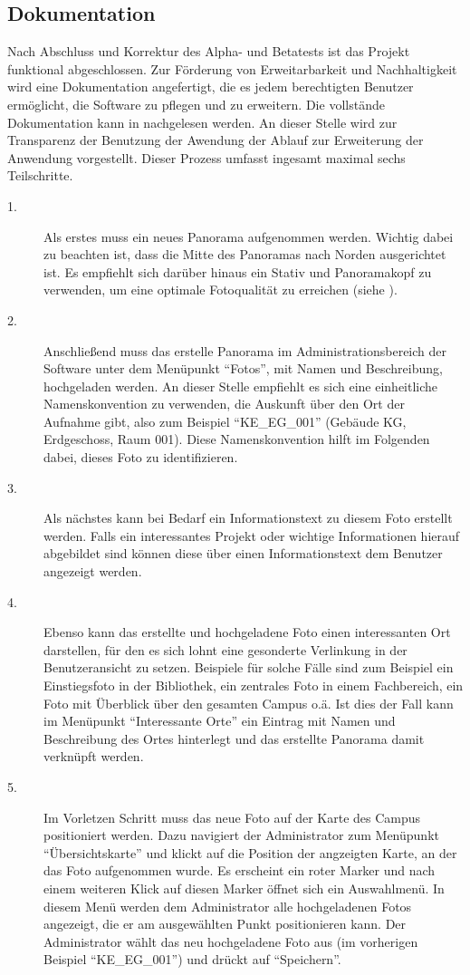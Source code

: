 \subsection{Dokumentation}
\label{sec:Dokumentation}

Nach Abschluss und Korrektur des Alpha- und Betatests ist das Projekt funktional abgeschlossen. Zur Förderung von Erweitarbarkeit und Nachhaltigkeit wird eine Dokumentation angefertigt, die es jedem berechtigten Benutzer ermöglicht, die Software zu pflegen und zu erweitern. Die vollstände Dokumentation kann in \citet{dokumentation2014} nachgelesen werden. An dieser Stelle wird zur Transparenz der Benutzung der Awendung der Ablauf zur Erweiterung der Anwendung vorgestellt. Dieser Prozess umfasst ingesamt maximal sechs Teilschritte.

\begin{description}
  \item[1.] Als erstes muss ein neues Panorama aufgenommen werden. Wichtig dabei zu beachten ist, dass die Mitte des Panoramas nach Norden ausgerichtet ist. Es empfiehlt sich darüber hinaus ein Stativ und Panoramakopf zu verwenden, um eine optimale Fotoqualität zu erreichen (siehe ).
  \item[2.] Anschließend muss das erstelle Panorama im Administrationsbereich der Software unter dem Menüpunkt "`Fotos"', mit Namen und Beschreibung, hochgeladen werden. An dieser Stelle empfiehlt es sich eine einheitliche Namenskonvention zu verwenden, die Auskunft über den Ort der Aufnahme gibt, also zum Beispiel "`KE\_EG\_001"' (Gebäude KG, Erdgeschoss, Raum 001). Diese Namenskonvention hilft im Folgenden dabei, dieses Foto zu identifizieren.
  \item[3.] Als nächstes kann bei Bedarf ein Informationstext zu diesem Foto erstellt werden. Falls ein interessantes Projekt oder wichtige Informationen hierauf abgebildet sind können diese über einen Informationstext dem Benutzer angezeigt werden.
  \item[4.] Ebenso kann das erstellte und hochgeladene Foto einen interessanten Ort darstellen, für den es sich lohnt eine gesonderte Verlinkung in der Benutzeransicht zu setzen. Beispiele für solche Fälle sind zum Beispiel ein Einstiegsfoto in der Bibliothek, ein zentrales Foto in einem Fachbereich, ein Foto mit Überblick über den gesamten Campus o.ä. Ist dies der Fall kann im Menüpunkt "`Interessante Orte"' ein Eintrag mit Namen und Beschreibung des Ortes hinterlegt und das erstellte Panorama damit verknüpft werden.
  \item[5.] Im Vorletzen Schritt muss das neue Foto auf der Karte des Campus positioniert werden. Dazu navigiert der Administrator zum Menüpunkt "`Übersichtskarte"' und klickt auf die Position der angzeigten Karte, an der das Foto aufgenommen wurde. Es erscheint ein roter Marker und nach einem weiteren Klick auf diesen Marker öffnet sich ein Auswahlmenü. In diesem Menü werden dem Administrator alle hochgeladenen Fotos angezeigt, die er am ausgewählten Punkt positionieren kann. Der Administrator wählt das neu hochgeladene Foto aus (im vorherigen Beispiel "`KE\_EG\_001"') und drückt auf "`Speichern"'.

\end{description}
